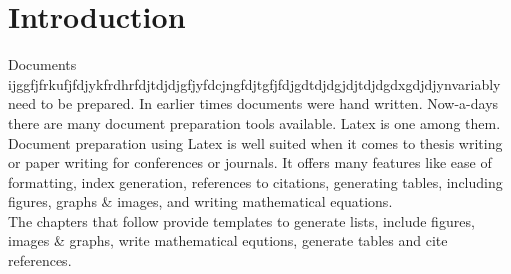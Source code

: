 \chapter{Introduction}
\graphicspath{{Introduction/IntroductionFigs/EPS/}{Introduction/IntroductionFigs/}}

Documents ijggfjfrkufjfdjykfrdhrfdjtdjdjgfjyfdcjngfdjtgfjfdjgdtdjdgjdjtdjdgdxgdjdjynvariably need to be prepared. In earlier times documents were hand written. Now-a-days there are many document preparation tools available. Latex is one among them. \\

Document preparation using Latex is well suited when it comes to thesis writing or paper writing for conferences or journals. It offers many features like ease of formatting, index generation, references to citations, generating tables, including figures, graphs \& images, and writing mathematical equations. \\

The chapters that follow provide templates to generate lists, include figures, images \& graphs,  write mathematical equtions, generate tables and cite references. 

